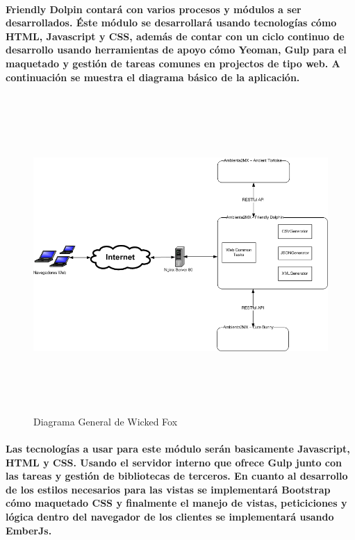    \paragraph{Friendly Dolpin contará con varios procesos y módulos a ser desarrollados. Éste módulo se desarrollará usando tecnologías cómo HTML, Javascript y CSS, además de contar con un ciclo continuo de desarrollo usando herramientas de apoyo cómo Yeoman, Gulp para el maquetado y gestión de tareas comunes en projectos de tipo web. A continuación se muestra el diagrama básico de la aplicación.}
  \newpage
    \begin{landscape}
      \begin{figure}[h!]
      \centering
      \includegraphics[width=22.5cm,height=12cm]{./images/DiagramaFriendlyDolphin.png}
      \caption{Diagrama General de Wicked Fox}
    \end{figure}
    \end{landscape}
  \newpage
  \paragraph{Las tecnologías a usar para este módulo serán basicamente Javascript, HTML y CSS. Usando el servidor interno que ofrece Gulp junto con las tareas y gestión de bibliotecas de terceros. En cuanto al desarrollo de los estilos necesarios para las vistas se implementará Bootstrap cómo maquetado CSS y finalmente el manejo de vistas, peticiciones y lógica dentro del navegador de los clientes se implementará usando EmberJs.}
